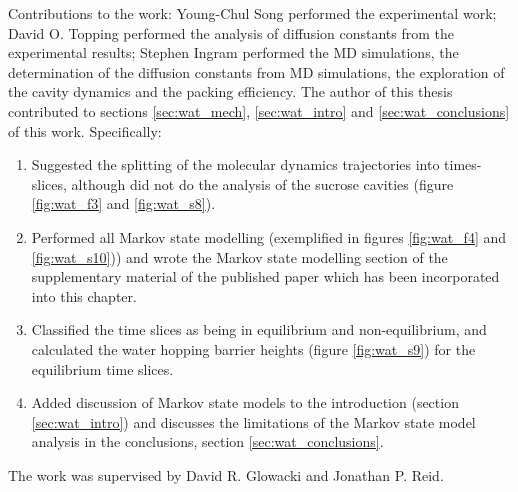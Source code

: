 Contributions to the work: Young-Chul Song performed the experimental work; David O. Topping performed the analysis of diffusion constants from the experimental results; Stephen Ingram performed the MD simulations, the determination of the diffusion constants from MD simulations, the exploration of the cavity dynamics and the packing efficiency. The author of this thesis contributed to sections \ref{sec:wat_mech}, \ref{sec:wat_intro} and \ref{sec:wat_conclusions} of this work. Specifically: 
\begin{enumerate}
    \item Suggested the splitting of the molecular dynamics trajectories into times-slices, although did not do the analysis of the sucrose cavities (figure \ref{fig:wat_f3} and \ref{fig:wat_s8}). 
    \item Performed all Markov state modelling (exemplified in figures \ref{fig:wat_f4} and \ref{fig:wat_s10})) and wrote the Markov state modelling section of the supplementary material of the published paper which has been incorporated into this chapter. 
    \item Classified the time slices as being in equilibrium and non-equilibrium, and calculated the water hopping barrier heights (figure \ref{fig:wat_s9}) for the equilibrium time slices. 
    \item Added discussion of Markov state models to the introduction (section \ref{sec:wat_intro}) and discusses the limitations of the Markov state model analysis in the conclusions, section \ref{sec:wat_conclusions}. 
\end{enumerate}
The work was supervised by David R. Glowacki and Jonathan P. Reid. 



